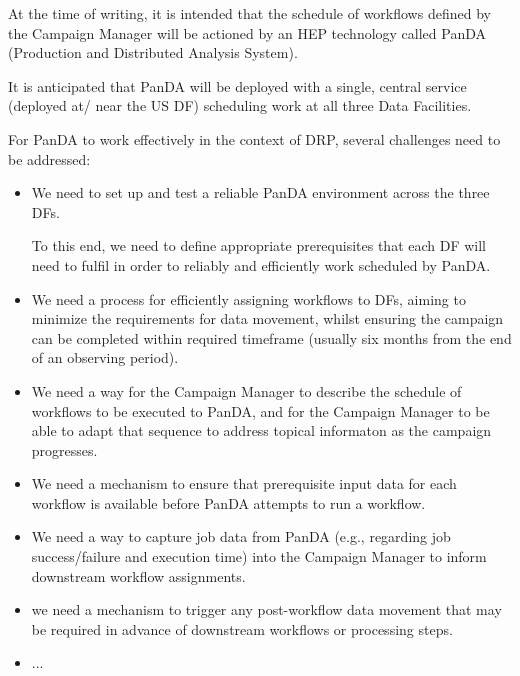 At the time of writing, it is intended that the schedule of workflows defined by the Campaign Manager will be actioned by an HEP technology called PanDA (Production and Distributed Analysis System).

It is anticipated that PanDA will be deployed with a single, central service (deployed at/ near the US DF) scheduling work at all three Data Facilities.

For PanDA to work effectively in the context of DRP, several challenges need to be addressed:

\begin{itemize}

\item We need to set up and test a reliable PanDA environment across the three DFs.

  To this end, we need to define appropriate prerequisites that each DF will need to fulfil in order to reliably and efficiently work scheduled by PanDA.

\item We need a process for efficiently assigning workflows to DFs, aiming to minimize the requirements for data movement, whilst ensuring the campaign can be completed within required timeframe (usually six months from the end of an observing period).

\item We need a way for the Campaign Manager to describe the schedule of workflows to be executed to PanDA, and for the Campaign Manager to be able to adapt that sequence to address topical informaton as the campaign progresses.

\item We need a mechanism to ensure that prerequisite input data for each workflow is available before PanDA attempts to run a workflow.

\item We need a way to capture job data from PanDA (e.g., regarding job success/failure and execution time) into the Campaign Manager to inform downstream workflow assignments.
  
\item we need a mechanism to trigger any post-workflow data movement that may be required in advance of downstream workflows or processing steps.

\item ...
  
\end{itemize}



